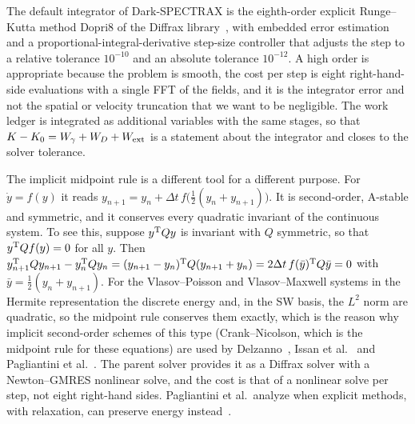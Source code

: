 The default integrator of Dark-SPECTRAX is the eighth-order explicit Runge--Kutta method Dopri8 of the Diffrax library~\citep{Kidger2021}, with embedded error estimation and a proportional-integral-derivative step-size controller that adjusts the step to a relative tolerance $10^{-10}$ and an absolute tolerance $10^{-12}$. A high order is appropriate because the problem is smooth, the cost per step is eight right-hand-side evaluations with a single FFT of the fields, and it is the integrator error and not the spatial or velocity truncation that we want to be negligible. The work ledger is integrated as additional variables with the same stages, so that $K-K_0=W_\gamma+W_D+W_{\rm ext}$ is a statement about the integrator and closes to the solver tolerance.

The implicit midpoint rule is a different tool for a different purpose. For $\dot y=f(y)$ it reads $y_{n+1}=y_n+\Delta t\,f\big(\tfrac12(y_n+y_{n+1})\big)$. It is second-order, A-stable and symmetric, and it conserves every quadratic invariant of the continuous system. To see this, suppose $y^{\rm T}Qy$ is invariant with $Q$ symmetric, so that $y^{\rm T}Qf(y)=0$ for all $y$. Then $y_{n+1}^{\rm T}Qy_{n+1}-y_n^{\rm T}Qy_n=(y_{n+1}-y_n)^{\rm T}Q(y_{n+1}+y_n)=2\Delta t\,f(\bar y)^{\rm T}Q\bar y=0$ with $\bar y=\tfrac12(y_n+y_{n+1})$. For the Vlasov--Poisson and Vlasov--Maxwell systems in the Hermite representation the discrete energy and, in the SW basis, the $L^2$ norm are quadratic, so the midpoint rule conserves them exactly, which is the reason why implicit second-order schemes of this type (Crank--Nicolson, which is the midpoint rule for these equations) are used by Delzanno~\citep{Delzanno2015}, Issan et al.~\citep{Issan2024a} and Pagliantini et al.~\citep{Pagliantini2023b}. The parent solver provides it as a Diffrax solver with a Newton--GMRES nonlinear solve, and the cost is that of a nonlinear solve per step, not eight right-hand sides. Pagliantini et al.\ analyze when explicit methods, with relaxation, can preserve energy instead~\citep{Pagliantini2023a}.

